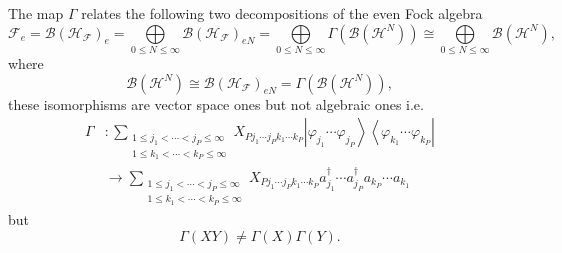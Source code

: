 \documentclass[aps,preprint]{revtex4}%
\begin{document}
The map $\Gamma$ relates the following two decompositions of the even Fock
algebra%
\begin{equation}
\mathcal{F}_{e}=\mathcal{B}\left(  \mathcal{H}_{\mathcal{F}}\right)  _{e}=%
{\displaystyle\bigoplus\limits_{0\leq N\leq\infty}}
\mathcal{B}\left(  \mathcal{H}_{\mathcal{F}}\right)  _{eN}=%
{\displaystyle\bigoplus\limits_{0\leq N\leq\infty}}
\Gamma\left(  \mathcal{B}\left(  \mathcal{H}^{N}\right)  \right)  \cong%
{\displaystyle\bigoplus\limits_{0\leq N\leq\infty}}
\mathcal{B}\left(  \mathcal{H}^{N}\right)  ,
\end{equation}
where
\begin{equation}
\mathcal{B}\left(  \mathcal{H}^{N}\right)  \cong\mathcal{B}\left(
\mathcal{H}_{\mathcal{F}}\right)  _{eN}=\Gamma\left(  \mathcal{B}\left(
\mathcal{H}^{N}\right)  \right)  ,
\end{equation}
these isomorphisms are vector space ones but not algebraic ones i.e.%
\begin{align}
\Gamma &  :\sum_{\substack{1\leq j_{1}<\cdots<j_{P}\leq\infty\\1\leq
k_{1}<\cdots<k_{P}\leq\infty}}X_{Pj_{1}\cdots j_{P}k_{1}\cdots k_{P}%
}\left\vert \varphi_{j_{1}}\cdots\varphi_{j_{P}}\right\rangle \left\langle
\varphi_{k_{1}}\cdots\varphi_{k_{P}}\right\vert \nonumber\\
&  \longrightarrow\sum_{\substack{1\leq j_{1}<\cdots<j_{P}\leq\infty\\1\leq
k_{1}<\cdots<k_{P}\leq\infty}}X_{Pj_{1}\cdots j_{P}k_{1}\cdots k_{P}}a_{j_{1}%
}^{\dagger}\cdots a_{j_{P}}^{\dagger}a_{k_{P}}\cdots a_{k_{1}}%
\end{align}
but
\begin{equation}
\Gamma(XY)\neq\Gamma(X)\Gamma(Y).
\end{equation}
\end{document}

